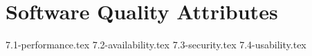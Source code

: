 \section{Software Quality Attributes}

{7.1-performance.tex}
{7.2-availability.tex}
{7.3-security.tex}
{7.4-usability.tex}
